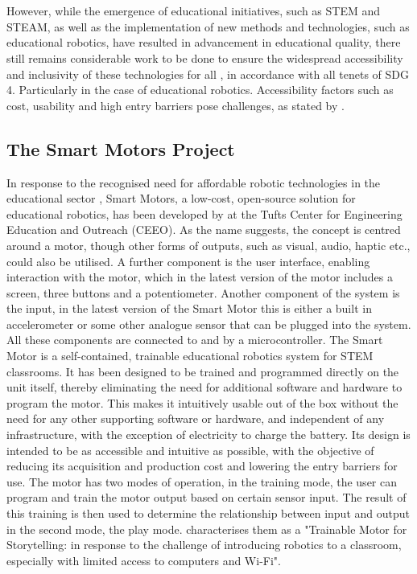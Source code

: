 \\\\
However, while the emergence of educational initiatives, such as STEM and STEAM, as well as the implementation of new methods and technologies, such as educational robotics, have resulted in advancement in educational quality, there still remains considerable work to be done to ensure the widespread accessibility and inclusivity of these technologies for all \citep{sapounidis_educational_2020}, in accordance with all tenets of SDG 4. Particularly in the case of educational robotics. Accessibility factors such as cost, usability and high entry barriers pose challenges, as stated by \citet{dahal_designing_2024, dahal_international_2023, johnson_implementation_2012}.

\subsection{\label{sec:intro_smp}The Smart Motors Project}%
In response to the recognised need for affordable robotic technologies in the educational sector \citep{khine_robotics_2017}, Smart Motors, a low-cost, open-source solution for educational robotics, has been developed by \citet{dahal_designing_2024} at the Tufts Center for Engineering Education and Outreach (CEEO). As the name suggests, the concept is centred around a motor, though other forms of outputs, such as visual, audio, haptic etc., could also be utilised. A further component is the user interface, enabling interaction with the motor, which in the latest version of the motor includes a screen, three buttons and a potentiometer. Another component of the system is the input, in the latest version of the Smart Motor this is either a built in accelerometer or some other analogue sensor that can be plugged into the system. All these components are connected to and by a microcontroller.
The Smart Motor is a self-contained, trainable educational robotics system for STEM classrooms. It has been designed to be trained and programmed directly on the unit itself, thereby eliminating the need for additional software and hardware to program the motor. This makes it intuitively usable out of the box without the need for any other supporting software or hardware, and independent of any infrastructure, with the exception of electricity to charge the battery. Its design is intended to be as accessible and intuitive as possible, with the objective of reducing its acquisition and production cost and lowering the entry barriers for use. The motor has two modes of operation, in the training mode, the user can program and train the motor output based on certain sensor input. The result of this training is then used to determine the relationship between input and output in the second mode, the play mode. \citet[][p. 3]{dahal_designing_2024} characterises them as a "Trainable Motor for Storytelling: in response to the challenge of introducing robotics to a classroom, especially with limited access to computers and Wi-Fi".
